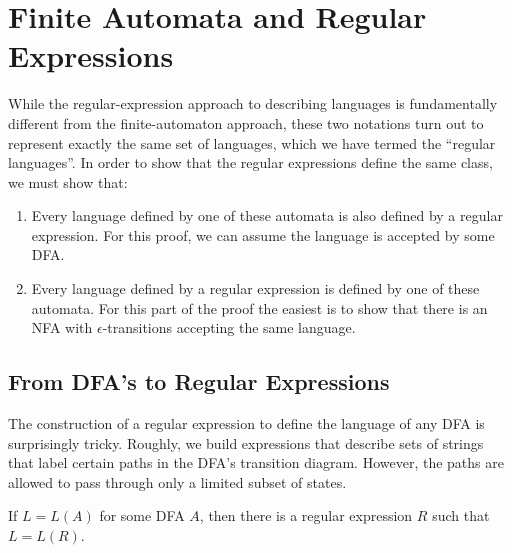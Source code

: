 \documentclass[]{article}
\begin{document}
\section*{Finite Automata and Regular Expressions}
  While the regular-expression approach to describing languages is fundamentally
  different from the finite-automaton approach, these two notations turn out to
  represent exactly the same set of languages, which we have termed the
  ``regular languages''. In order to show that the regular expressions define
  the same class, we must show that:
  \begin{enumerate}
    \item Every language defined by one of these automata is also defined by a
    regular expression. For this proof, we can assume the language is accepted
    by some DFA.
    \item Every language defined by a regular expression is defined by one of
    these automata. For this part of the proof the easiest is to show that there
    is an NFA with $\epsilon$-transitions accepting the same language. \\
  \end{enumerate}

  \subsection*{From DFA's to Regular Expressions}
    The construction of a regular expression to define the language of any DFA
    is surprisingly tricky. Roughly, we build expressions that describe sets of
    strings that label certain paths in the DFA's transition diagram. However,
    the paths are allowed to pass through only a limited subset of states.
    \begin{thm}
      If $L = L(A)$ for some DFA $A$, then there is a regular expression $R$
      such that $L = L(R)$.
    \end{thm}
\end{document}
